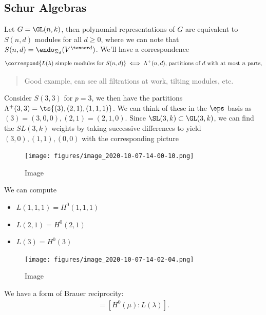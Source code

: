 \hypertarget{schur-algebras}{%
\subsection{Schur Algebras}\label{schur-algebras}}

Let \(G = \GL(n, k)\), then polynomial representations of \(G\) are
equivalent to \(S(n, d)\) modules for all \(d\geq 0\), where we can note
that \(S(n, d) = \endo_{\Sigma_d}(V^{\tensor d})\). We'll have a
correspondence
\begin{align*}  
\correspond{L(\lambda) \text{ simple modules for } S(n,d)}
\iff
\Lambda^+(n, d) \text{, partitions of $d$ with at most $n$ parts}
,\end{align*}

\begin{example}

\begin{quote}
Good example, can see all filtrations at work, tilting modules, etc.
\end{quote}

Consider \(S(3, 3)\) for \(p=3\), we then have the partitions
\(\Lambda^+(3, 3) = \ts{(3), (2, 1), (1,1,1)}\). We can think of these
in the \(\eps\) basis as \((3) = (3,0,0), (2,1) = (2,1,0)\). Since
\(\SL(3, k) \subset \GL(3, k)\), we can find the \(SL(3, k)\) weights by
taking successive differences to yield \((3, 0), (1, 1), (0, 0)\) with
the corresponding picture

\begin{figure}
\centering
\texttt{[image: figures/image\_2020-10-07-14-00-10.png]}
\caption{Image}
\end{figure}

We can compute

\begin{itemize}
\tightlist
\item
  \(L(1,1,1) = H^0(1,1,1)\)
\item
  \(L(2, 1) = H^0(2, 1)\)
\item
  \(L(3) = H^0(3)\)
\end{itemize}

\begin{figure}
\centering
\texttt{[image: figures/image\_2020-10-07-14-02-04.png]}
\caption{Image}
\end{figure}

We have a form of Brauer reciprocity:
\begin{align*}  
[I(\lambda): H^0(\mu)] = [H^0(\mu) : L(\lambda) ] 
.\end{align*}


\end{example}
